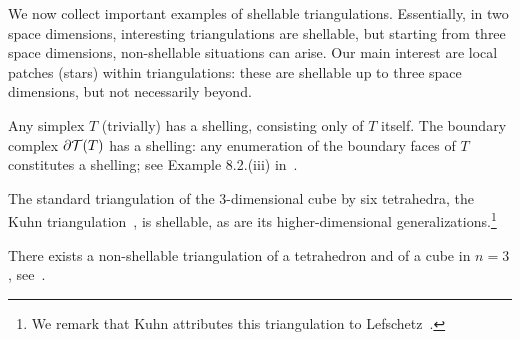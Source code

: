 \documentclass[10pt,a4paper]{article}
\begin{document}
We now collect important examples of shellable triangulations. Essentially, in two space dimensions, interesting triangulations are shellable, but starting from three space dimensions, non-shellable situations can arise. Our main interest are local patches (stars) within triangulations: these are shellable up to three space dimensions, but not necessarily beyond. 

\begin{example}\label{example:shell_simpl}
    Any simplex $T$ (trivially) has a shelling, consisting only of $T$ itself. 
    The boundary complex $\partial {\mathcal T}(T)$ has a shelling:
    any enumeration of the boundary faces of $T$ constitutes a shelling; see Example 8.2.(iii) in~\cite{ziegler1995lectures}.
\end{example}
\begin{example}
    The standard triangulation of the $3$-dimensional cube by six tetrahedra, the Kuhn triangulation~\cite{kuhn1960some}, is shellable, as are its higher-dimensional generalizations.\footnote{We remark that Kuhn attributes this triangulation to Lefschetz~\cite{lefschetz2015introduction}.}
\end{example}
\begin{example}
    There exists a non-shellable triangulation of a tetrahedron and of a cube in $n=3$, see~\cite[Example 8.9]{ziegler1995lectures}.
\end{example}
\end{document}
